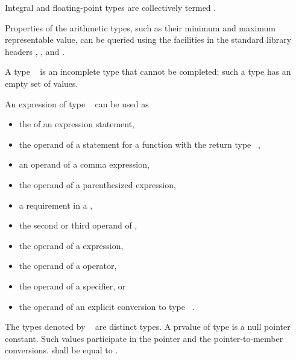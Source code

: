 \pnum
Integral and floating-point types are collectively
termed .
\begin{note}
Properties of the arithmetic types,
such as their minimum and maximum representable value,
can be queried using the facilities in the standard library headers
,
, and
.
\end{note}

\pnum
{}%
A type \cv{}~
is an incomplete type that cannot be completed; such a type has
an empty set of values.
\begin{note}
An expression of type \cv{}~ can be used as
\begin{itemize}
\item the  of an expression statement,
\item the operand of a  statement
for a function with the return type \cv{}~,
\item an operand of a comma expression,
\item the operand of a parenthesized expression,
\item a requirement in a ,
\item the second or third operand of ,
\item the operand of a  expression,
\item the operand of a  operator,
\item the operand of a  specifier, or
\item the operand of an explicit conversion to type
\cv{}~.
\end{itemize}
\end{note}

\pnum
The types denoted by \cv~ are distinct types.
A prvalue of type  is a null pointer
constant. Such values participate in the pointer and the
pointer-to-member conversions.
 shall be equal to .

